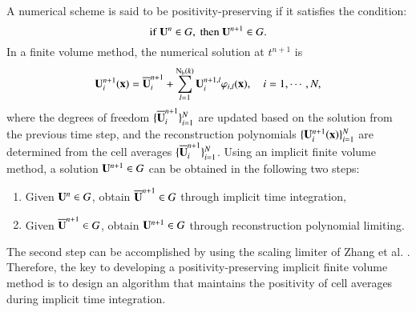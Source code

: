 A numerical scheme is said to be positivity-preserving if it satisfies the condition:
\begin{equation}
     \mathrm{if} \ \mathbf{U}^{n} \in G, \ \mathrm{then} \ \mathbf{U}^{n+1} \in G.
\end{equation}
In a finite volume method, the numerical solution at $t^{n+1}$ is
\begin{equation}
    \mathbf{U}^{n+1}_i (\mathbf{x})= \overline{\mathbf{U}}^{n+1}_i + \sum_{l=1}^{\mathrm{N_b}(k)} \mathbf{U}_i^{n+1,l} \varphi_{i,l}(\mathbf{x}), \quad i=1, \cdots,N,
\end{equation}
where the degrees of freedom $\{\overline{\mathbf{U}}^{n+1}_i\}_{i=1}^{N}$ are updated based on the solution from the previous time step, and the reconstruction polynomials $\{\mathbf{U}^{n+1}_i (\mathbf{x})\}_{i=1}^N$ are determined from the cell averages $\{\overline{\mathbf{U}}^{n+1}_i\}_{i=1}^N$.
Using an implicit finite volume method, a solution $\mathbf{U}^{n+1} \in G$ can be obtained in the following two steps:
\begin{enumerate}[label=(\arabic*)]
    \item Given $\mathbf{U}^n \in G$, obtain $\overline{\mathbf{U}}^{n+1} \in G$ through implicit time integration,
    \item Given $\overline{\mathbf{U}}^{n+1} \in G$, obtain $\mathbf{U}^{n+1} \in G$ through reconstruction polynomial limiting.
\end{enumerate}
The second step can be accomplished by using the scaling limiter of Zhang et al. \cite{zhang2010positivity}. Therefore, the key to developing a positivity-preserving implicit finite volume method is to design an algorithm that maintains the positivity of cell averages during implicit time integration.

